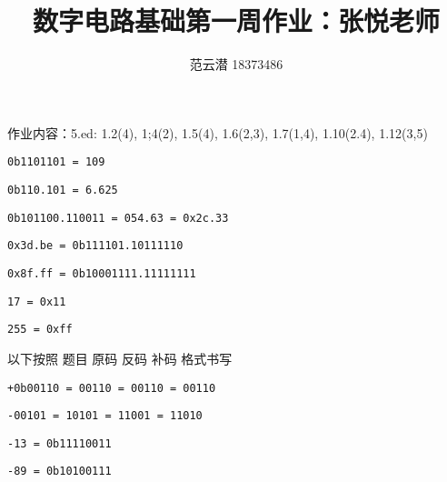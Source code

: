 \documentclass[lang=cn,11pt,a4paper,cite=authoryear]{elegantpaper}
\title{数字电路基础\quad 第一周作业：张悦老师}
\author{范云潜 18373486}
\institute{微电子学院 184111 班}
\date{\zhtoday}
\begin{document}
\maketitle

作业内容：5.ed: 1.2(4), 1;4(2), 1.5(4), 1.6(2,3), 1.7(1,4), 1.10(2.4), 1.12(3,5)


\lstinline{0b1101101 = 109}


\lstinline{0b110.101 = 6.625}


\lstinline{0b101100.110011 = 054.63 = 0x2c.33}


\lstinline{0x3d.be = 0b111101.10111110}

\lstinline{0x8f.ff = 0b10001111.11111111}


\lstinline{17 = 0x11}

\lstinline{255 = 0xff}



以下按照 题目 原码 反码 补码 格式书写

\lstinline{+0b00110 = 00110 = 00110 = 00110}

\lstinline{-00101 = 10101 = 11001 = 11010}


\lstinline{-13 = 0b11110011}

\lstinline{-89 = 0b10100111}

% 

\end{document}
